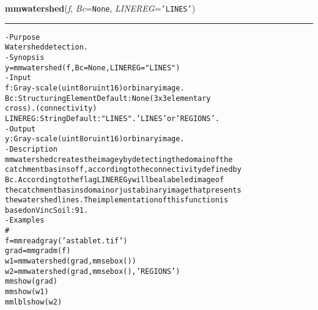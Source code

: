     \begin{boxedminipage}{\textwidth}

    \raggedright \textbf{mmwatershed}(\textit{f}, \textit{Bc}=\texttt{N\-o\-n\-e\-}, \textit{LINEREG}=\texttt{'\-L\-I\-N\-E\-S\-'\-})

    \vspace{-1.5ex}

    \rule{\textwidth}{0.5\fboxrule}
\begin{alltt}
- Purpose
    Watershed detection.
- Synopsis
    y = mmwatershed(f, Bc=None, LINEREG="LINES")
- Input
    f:       Gray-scale (uint8 or uint16) or binary image.
    Bc:      Structuring Element Default: None (3x3 elementary
             cross). ( connectivity)
    LINEREG: String Default: "LINES". 'LINES' or ' REGIONS'.
- Output
    y: Gray-scale (uint8 or uint16) or binary image.
- Description
    mmwatershed creates the image y by detecting the domain of the
    catchment basins of f , according to the connectivity defined by
    Bc . According to the flag LINEREG y will be a labeled image of
    the catchment basins domain or just a binary image that presents
    the watershed lines. The implementation of this function is
    based on VincSoil:91 .
- Examples
    \#
    f=mmreadgray('astablet.tif')
    grad=mmgradm(f)
    w1=mmwatershed(grad,mmsebox())
    w2=mmwatershed(grad,mmsebox(),'REGIONS')
    mmshow(grad)
    mmshow(w1)
    mmlblshow(w2)\end{alltt}

    \vspace{1ex}

    \end{boxedminipage}

    \label{multireg:num_pymorph:sign}
    \vspace{0.5ex}

